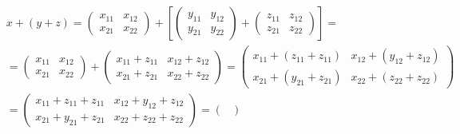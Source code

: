 \begin{exercise}[Sean: $x=\begin{pmatrix}
				x_{11} & x_{12} \\x_{21}&x_{22}
			\end{pmatrix},y=\begin{pmatrix}y_{11} & y_{12} \\y_{21}&y_{22}
			\end{pmatrix}, z=\begin{pmatrix}z_{11} & z_{12} \\z_{21}&z_{22}
			\end{pmatrix}\in M_{2\times 2}(\R)$]

	\begin{align*}
		 & x+(y+z)=\begin{pmatrix}
			           x_{11} & x_{12} \\x_{21}&x_{22}
		           \end{pmatrix}+\left[\begin{pmatrix}y_{11} & y_{12} \\y_{21}&y_{22}
			                               \end{pmatrix}+\begin{pmatrix}z_{11} & z_{12} \\z_{21}&z_{22}
			                                             \end{pmatrix}\right]=                                     \\
		 & =\begin{pmatrix}
			    x_{11} & x_{12} \\x_{21}&x_{22}
		    \end{pmatrix}+\begin{pmatrix}
			                  x_{11}+z_{11} & x_{12}+z_{12} \\x_{21}+z_{21}&x_{22}+z_{22}
		                  \end{pmatrix}=\begin{pmatrix}
			                                x_{11}+(z_{11}+z_{11}) & x_{12}+(y_{12}+z_{12}) \\x_{21}+(y_{21}+z_{21})&x_{22}+(z_{22}+z_{22})
		                                \end{pmatrix} \\
		 & =\begin{pmatrix}
			    x_{11}+z_{11}+z_{11} & x_{12}+y_{12}+z_{12} \\x_{21}+y_{21}+z_{21}&x_{22}+z_{22}+z_{22}
		    \end{pmatrix}=\begin{pmatrix}

\end{pmatrix}
\end{align*}
\end{exercise}
